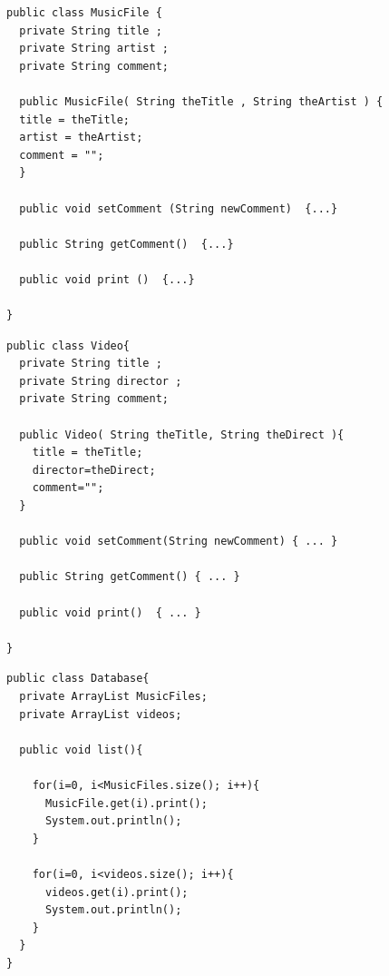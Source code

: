 \documentclass{beamer}
\begin{document}
\begin{frame}[fragile]
\begin{block}{}
\begin{lstlisting}
public class MusicFile {
  private String title ; 
  private String artist ; 
  private String comment;

  public MusicFile( String theTitle , String theArtist ) {
  title = theTitle; 
  artist = theArtist; 
  comment = "";
  }

  public void setComment (String newComment)  {...}

  public String getComment()  {...}

  public void print ()  {...}
  
}
\end{lstlisting}
\end{block}
\end{frame}

\begin{frame}[fragile]
\begin{block}{}
\begin{lstlisting}
public class Video{
  private String title ; 
  private String director ; 
  private String comment;	

  public Video( String theTitle, String theDirect ){
    title = theTitle;
    director=theDirect;
    comment="";
  }	

  public void setComment(String newComment) { ... }

  public String getComment() { ... }

  public void print()  { ... }	

}
\end{lstlisting}
\end{block}
\end{frame}

\begin{frame}[fragile]
\begin{block}{}
\begin{lstlisting}
public class Database{
  private ArrayList MusicFiles;
  private ArrayList videos;

  public void list(){
	
    for(i=0, i<MusicFiles.size(); i++){
      MusicFile.get(i).print();
      System.out.println();
    }
    	
    for(i=0, i<videos.size(); i++){
      videos.get(i).print();
      System.out.println();	
    } 
  }	
}	
\end{lstlisting}
\end{block}
\end{frame}
\end{document}
